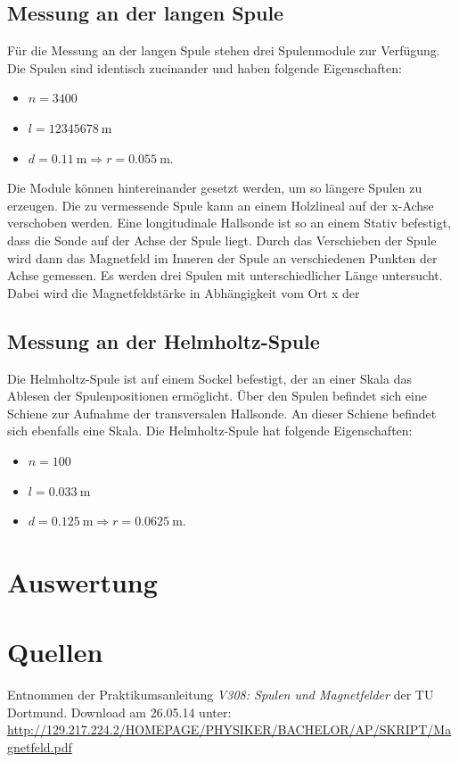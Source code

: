 \documentclass[11pt,ngerman,a4paper]{article}
\begin{document}
\subsection{Messung an der langen Spule}
Für die Messung an der langen Spule stehen drei Spulenmodule zur Verfügung. Die Spulen sind identisch zueinander und haben folgende Eigenschaften:
\begin{itemize}
\item $n = 3400$
\item $l = \SI{12345678}{\meter}$
\item $d = \SI{0.11}{\meter} \Rightarrow r =  \SI{0.055}{\meter} $.
\end{itemize}
Die Module können hintereinander gesetzt werden, um so längere Spulen zu erzeugen. Die zu vermessende Spule kann an einem Holzlineal auf der x-Achse verschoben werden. Eine longitudinale Hallsonde ist so an einem Stativ befestigt, dass die Sonde auf der Achse der Spule liegt. Durch das Verschieben der Spule wird dann das Magnetfeld im Inneren der Spule an verschiedenen Punkten der Achse gemessen.
\newline
Es werden drei Spulen mit unterschiedlicher Länge untersucht. Dabei wird die Magnetfeldstärke in Abhängigkeit vom Ort x der 
\subsection{Messung an der Helmholtz-Spule}
Die Helmholtz-Spule ist auf einem Sockel befestigt, der an einer Skala das Ablesen der Spulenpositionen ermöglicht. Über den Spulen befindet sich eine Schiene zur Aufnahme der transversalen Hallsonde. An dieser Schiene befindet sich ebenfalls eine Skala. Die Helmholtz-Spule hat folgende Eigenschaften:
\begin{itemize}
\item $n = 100$
\item $l = \SI{0.033}{\meter}$
\item $d = \SI{0.125}{\meter} \Rightarrow r =  \SI{0.0625}{\meter} $.
\end{itemize}

\section{Auswertung}

\section{Quellen}
\begin{enumerate}[{[}1{]}]
\item Entnommen der Praktikumsanleitung \textit{V308: Spulen und Magnetfelder} der TU Dortmund. Download am 26.05.14 unter:\\
 \url{http://129.217.224.2/HOMEPAGE/PHYSIKER/BACHELOR/AP/SKRIPT/Magnetfeld.pdf}
\end{enumerate}
\end{document}
